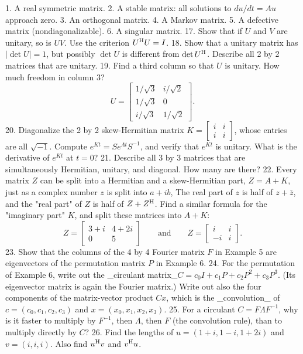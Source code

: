 1. A real symmetric matrix. 2. A stable matrix: all solutions to \(du/dt=Au\) approach zero. 3. An orthogonal matrix. 4. A Markov matrix. 5. A defective matrix (nondiagonalizable). 6. A singular matrix.
17. Show that if \(U\) and \(V\) are unitary, so is \(UV\). Use the criterion \(U^{\rm H}U=I\).
18. Show that a unitary matrix has \(|\det U|=1\), but possibly \(\det U\) is different from \(\det U^{\rm H}\). Describe all 2 by 2 matrices that are unitary.
19. Find a third column so that \(U\) is unitary. How much freedom in column 3? \[U=\begin{bmatrix}1/\sqrt{3}&i/\sqrt{2}\\ 1/\sqrt{3}&0\\ i/\sqrt{3}&1/\sqrt{2}\end{bmatrix}.\]
20. Diagonalize the 2 by 2 skew-Hermitian matrix \(K=\begin{bmatrix}i&i\\ i&i\end{bmatrix}\), whose entries are all \(\sqrt{-1}\). Compute \(e^{Kt}=Se^{\Lambda t}S^{-1}\), and verify that \(e^{Kt}\) is unitary. What is the derivative of \(e^{Kt}\) at \(t=0\)?
21. Describe all 3 by 3 matrices that are simultaneously Hermitian, unitary, and diagonal. How many are there?
22. Every matrix \(Z\) can be split into a Hermitian and a skew-Hermitian part, \(Z=A+K\), just as a complex number \(z\) is split into \(a+ib\), The real part of \(z\) is half of \(z+\bar{z}\), and the "real part" of \(Z\) is half of \(Z+Z^{\rm H}\). Find a similar formula for the "imaginary part" \(K\), and split these matrices into \(A+K\): \[Z=\begin{bmatrix}3+i&4+2i\\ 0&5\end{bmatrix}\qquad\text{and}\qquad Z=\begin{bmatrix}i&i\\ -i&i\end{bmatrix}.\]
23. Show that the columns of the 4 by 4 Fourier matrix \(F\) in Example 5 are eigenvectors of the permutation matrix \(P\) in Example 6.
24. For the permutation of Example 6, write out the _circulant matrix_\(C=c_{0}I+c_{1}P+c_{2}P^{2}+c_{3}P^{3}\). (Its eigenvector matrix is again the Fourier matrix.) Write out also the four components of the matrix-vector product \(Cx\), which is the _convolution_ of \(c=(c_{0},c_{1},c_{2},c_{3})\) and \(x=(x_{0},x_{1},x_{2},x_{3})\).
25. For a circulant \(C=F\Lambda F^{-1}\), why is it faster to multiply by \(F^{-1}\), then \(\Lambda\), then \(F\) (the convolution rule), than to multiply directly by \(C\)?
26. Find the lengths of \(u=(1+i,1-i,1+2i)\) and \(v=(i,i,i)\). Also find \(u^{\rm H}v\) and \(v^{\rm H}u\).

 